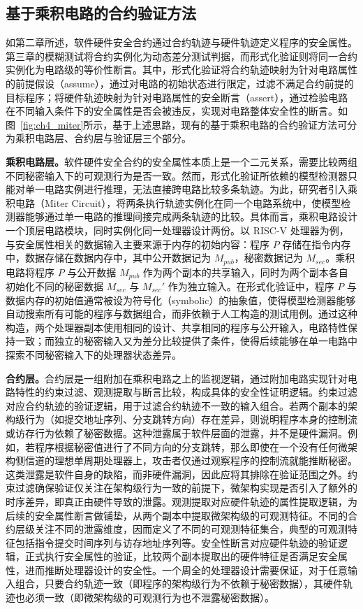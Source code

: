 \subsection{基于乘积电路的合约验证方法}
\label{subsec:ch4_miter}

如第二章所述，软件硬件安全合约通过合约轨迹与硬件轨迹定义程序的安全属性。第三章的模糊测试将合约实例化为动态差分测试判据，而形式化验证则将同一合约实例化为电路级的等价性断言。其中，形式化验证将合约轨迹映射为针对电路属性的前提假设（assume），通过对电路的初始状态进行限定，过滤不满足合约前提的目标程序；将硬件轨迹映射为针对电路属性的安全断言（assert），通过检验电路在不同输入条件下的安全属性是否会被违反，实现对电路整体安全性的断言。如图~\ref{fig:ch4_miter}所示，基于上述思路，现有的基于乘积电路的合约验证方法可分为乘积电路层、合约层与验证层三个部分。

\textbf{乘积电路层。}软件硬件安全合约的安全属性本质上是一个二元关系，需要比较两组不同秘密输入下的可观测行为是否一致。然而，形式化验证所依赖的模型检测器只能对单一电路实例进行推理，无法直接跨电路比较多条轨迹。为此，研究者引入乘积电路（Miter Circuit），将两条执行轨迹实例化在同一个电路系统中，使模型检测器能够通过单一电路的推理间接完成两条轨迹的比较。具体而言，乘积电路设计一个顶层电路模块，同时实例化同一处理器设计两份。以 RISC-V 处理器为例，与安全属性相关的数据输入主要来源于内存的初始内容：程序 $P$ 存储在指令内存中，数据存储在数据内存中，其中公开数据记为 $M_{pub}$，秘密数据记为 $M_{sec}$。乘积电路将程序 $P$ 与公开数据 $M_{pub}$ 作为两个副本的共享输入，同时为两个副本各自初始化不同的秘密数据 $M_{sec}$ 与 $M_{sec}'$ 作为独立输入。在形式化验证中，程序 $P$ 与数据内存的初始值通常被设为符号化（symbolic）的抽象值，使得模型检测器能够自动搜索所有可能的程序与数据组合，而非依赖于人工构造的测试用例。通过这种构造，两个处理器副本使用相同的设计、共享相同的程序与公开输入，电路特性保持一致；而独立的秘密输入又为差分比较提供了条件，使得后续能够在单一电路中探索不同秘密输入下的处理器状态差异。

\textbf{合约层。}合约层是一组附加在乘积电路之上的监视逻辑，通过附加电路实现针对电路特性的约束过滤、观测提取与断言比较，构成具体的安全性证明逻辑。约束过滤对应合约轨迹的验证逻辑，用于过滤合约轨迹不一致的输入组合。若两个副本的架构级行为（如提交地址序列、分支跳转方向）存在差异，则说明程序本身的控制流或访存行为依赖了秘密数据。这种泄露属于软件层面的泄露，并不是硬件漏洞。例如，若程序根据秘密值进行了不同方向的分支跳转，那么即使在一个没有任何微架构侧信道的理想单周期处理器上，攻击者仅通过观察程序的控制流就能推断秘密。这类泄露是软件自身的缺陷，而非硬件漏洞，因此应将其排除在验证范围之外。约束过滤确保验证仅关注在架构级行为一致的前提下，微架构实现是否引入了额外的时序差异，即真正由硬件导致的泄露。观测提取对应硬件轨迹的属性提取逻辑，为后续的安全属性断言做铺垫，从两个副本中提取微架构级的可观测特征。不同的合约层级关注不同的泄露维度，因而定义了不同的可观测特征集合，典型的可观测特征包括指令提交时间序列与访存地址序列等。安全性断言对应硬件轨迹的验证逻辑，正式执行安全属性的验证，比较两个副本提取出的硬件特征是否满足安全属性，进而推断处理器设计的安全性。一个周全的处理器设计需要保证，对于任意输入组合，只要合约轨迹一致（即程序的架构级行为不依赖于秘密数据），其硬件轨迹也必须一致（即微架构级的可观测行为也不泄露秘密数据）。

